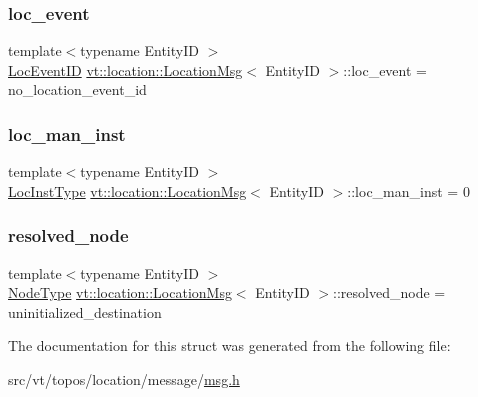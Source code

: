 \mbox{\label{structvt_1_1location_1_1_location_msg_a9550d842c2e1dcd3a5c48675c6b5c080}} 
\subsubsection{\texorpdfstring{loc\+\_\+event}{loc\_event}}
{\footnotesize\ttfamily template$<$typename Entity\+ID $>$ \\
\hyperlink{namespacevt_1_1location_aa5ccc1a42aa22b0b41fcfbbdee314dca}{Loc\+Event\+ID} \hyperlink{structvt_1_1location_1_1_location_msg}{vt\+::location\+::\+Location\+Msg}$<$ Entity\+ID $>$\+::loc\+\_\+event = no\+\_\+location\+\_\+event\+\_\+id}

\mbox{\label{structvt_1_1location_1_1_location_msg_ad685e327f058d12836ed9743d44b14b7}} 
\subsubsection{\texorpdfstring{loc\+\_\+man\+\_\+inst}{loc\_man\_inst}}
{\footnotesize\ttfamily template$<$typename Entity\+ID $>$ \\
\hyperlink{namespacevt_1_1location_a4db6456e8024af2d23fc5ae560fef866}{Loc\+Inst\+Type} \hyperlink{structvt_1_1location_1_1_location_msg}{vt\+::location\+::\+Location\+Msg}$<$ Entity\+ID $>$\+::loc\+\_\+man\+\_\+inst = 0}

\mbox{\label{structvt_1_1location_1_1_location_msg_a4c047bbd95901a1543e17e7924e1d2d3}} 
\subsubsection{\texorpdfstring{resolved\+\_\+node}{resolved\_node}}
{\footnotesize\ttfamily template$<$typename Entity\+ID $>$ \\
\hyperlink{namespacevt_a866da9d0efc19c0a1ce79e9e492f47e2}{Node\+Type} \hyperlink{structvt_1_1location_1_1_location_msg}{vt\+::location\+::\+Location\+Msg}$<$ Entity\+ID $>$\+::resolved\+\_\+node = uninitialized\+\_\+destination}



The documentation for this struct was generated from the following file\+:\begin{DoxyCompactItemize}
\item 
src/vt/topos/location/message/\hyperlink{msg_8h}{msg.\+h}\end{DoxyCompactItemize}
